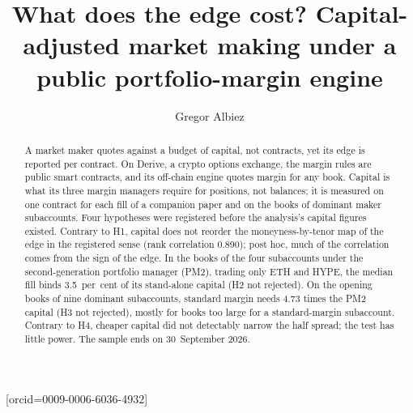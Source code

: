 \documentclass[a4paper,fleqn]{cas-dc}
\begin{document}

\title[mode=title]{What does the edge cost? Capital-adjusted market making under a public portfolio-margin engine}

\author[1]{Gregor Albiez}[orcid=0009-0006-6036-4932]


\begin{abstract}
A market maker quotes against a budget of capital, not contracts, yet its edge is reported per contract. On
Derive, a crypto options exchange, the margin rules are public smart contracts, and its off-chain engine quotes
margin for any book. Capital is what its three margin managers require for positions, not balances; it is
measured on one contract for each fill of a companion paper and on the books of dominant maker
subaccounts. Four hypotheses were registered before the analysis's capital figures existed. Contrary to H1, capital
does not reorder the moneyness-by-tenor map of the edge in the registered sense (rank correlation 0.890); post hoc, much of the
correlation comes from the sign of the edge. In the books of the four subaccounts under the second-generation
portfolio manager (PM2), trading only ETH and HYPE, the median fill binds 3.5~per~cent of its stand-alone
capital (H2 not rejected). On the opening books of nine dominant subaccounts, standard margin needs 4.73 times
the PM2 capital (H3 not rejected), mostly for books too large for a standard-margin subaccount. Contrary to H4,
cheaper capital did not detectably narrow the half spread; the test has little power. The sample ends on
30~September 2026.
\end{abstract}
\end{document}
